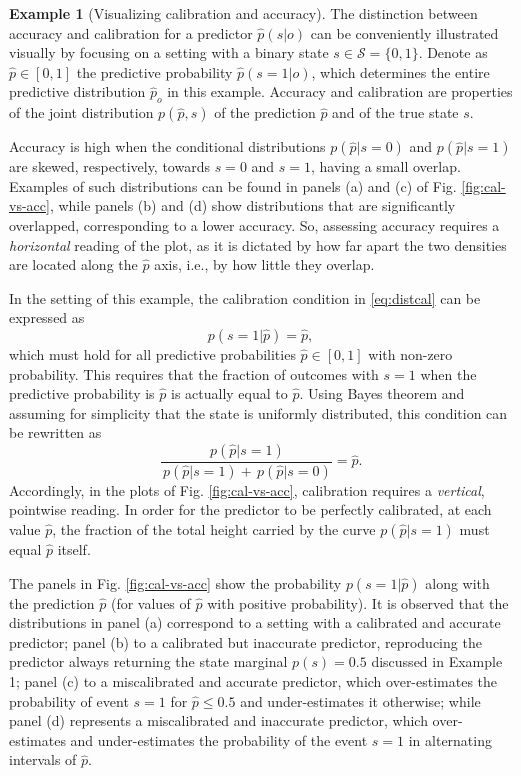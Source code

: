 \documentclass[journal]{IEEEtran}
\theoremstyle{definition}
\newtheorem{example}{Example}
\theoremstyle{remark}
\begin{document}
{
\begin{example}[Visualizing calibration and accuracy]
The distinction between accuracy and calibration for a predictor $\hat p(s|o)$ can be conveniently illustrated visually by focusing on a setting with a binary state $s\in\mathcal{S}=\{0,1\}$. Denote as $\hat p \in [0,1]$ the predictive probability $\hat p(s=1|o)$, which determines the  entire predictive distribution $\hat p_o$ in this example. Accuracy and calibration are properties of the joint distribution $p(\hat p,s)$ of the prediction $\hat p$ and of the true state $s$.

Accuracy is high when the conditional distributions $p(\hat p|s=0)$ and $p(\hat p|s=1)$ are skewed, respectively,  towards $s=0$ and $s=1$, having a small overlap.  Examples of such distributions can be found in panels (a) and (c) of Fig. \ref{fig:cal-vs-acc}, while panels (b) and (d) show distributions that are significantly overlapped, corresponding to a lower accuracy. So,  assessing accuracy requires a \emph{horizontal} reading of the plot, as it is dictated by how far apart the two densities are located  along the $\hat p$ axis, i.e., by how little they overlap. 

In the setting of this example, the calibration condition in \eqref{eq:distcal} can be expressed as\begin{equation}
p(s=1|\hat p)=\hat p, 
\label{eq:distcal-binary}
\end{equation} which must hold for all predictive probabilities $\hat p \in[0,1]$ with non-zero probability. This requires that the fraction of outcomes with $s=1$ when the predictive probability is $\hat{p}$ is actually equal to $\hat{p}$. Using Bayes theorem and assuming for simplicity that the state is uniformly distributed, this condition can be rewritten as 
\begin{equation}
\frac{\,p(\hat p|s=1)}{\,p(\hat p|s=1)+\,p(\hat p|s=0)}=\hat{p}.
\label{eq:posterior-ratio}
\end{equation} Accordingly, in the plots of Fig. \ref{fig:cal-vs-acc}, calibration requires a \emph{vertical}, pointwise reading. In order for the predictor to be perfectly calibrated, at each value  $\hat p$, the fraction of the total height carried by the curve $p(\hat p|s=1)$ must equal $\hat p$ itself. 

The panels in Fig. \ref{fig:cal-vs-acc} show the probability $p(s=1|\hat{p})$  along with the prediction $\hat p$  (for values of $\hat{p}$ with positive probability).  It is observed that the distributions in panel (a) correspond to a setting with a calibrated and accurate predictor; panel (b) to a calibrated but inaccurate predictor, reproducing the predictor always returning the state marginal $p(s)=0.5$ discussed in Example 1; panel (c) to a miscalibrated and accurate predictor, which over-estimates the probability of event $s=1$ for $\hat p \leq 0.5$ and under-estimates it otherwise; while panel (d) represents a miscalibrated and
inaccurate predictor, which over-estimates and under-estimates the probability of
the event $s=1$ in alternating intervals of $\hat p$.
\end{example}


}
\end{document}
